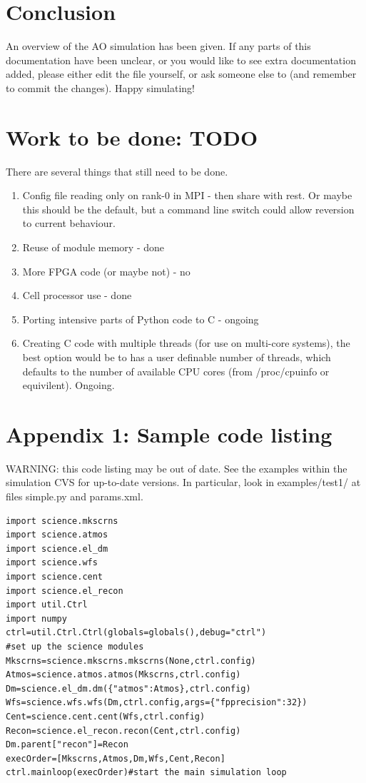 \documentclass{article}
\begin{document}
\section{Conclusion}
An overview of the AO simulation has been given.  If any parts of this
documentation have been unclear, or you would like to see extra
documentation added, please either edit the file yourself, or ask
someone else to (and remember to commit the changes).  Happy
simulating!

\section{Work to be done: TODO}
There are several things that still need to be done.
\begin{enumerate}
\item Config file reading only on rank-0 in MPI - then share with
  rest.  Or maybe this should be the default, but a command line
  switch could allow reversion to current behaviour.
\item Reuse of module memory - done
\item More FPGA code (or maybe not) - no
\item Cell processor use - done
\item Porting intensive parts of Python code to C - ongoing
\item Creating C code with multiple threads (for use on multi-core
  systems), the best option would be to has a user definable number of
  threads, which defaults to the number of available CPU cores (from
  /proc/cpuinfo or equivilent).  Ongoing.
\end{enumerate}


\appendix
\section*{Appendix 1: Sample code listing}
\label{app:src}
WARNING: this code listing may be out of date.  See the examples
within the simulation CVS for up-to-date versions.  In particular,
look in examples/test1/ at files simple.py and params.xml.

\begin{verbatim}
import science.mkscrns
import science.atmos
import science.el_dm
import science.wfs
import science.cent
import science.el_recon
import util.Ctrl
import numpy
ctrl=util.Ctrl.Ctrl(globals=globals(),debug="ctrl")
#set up the science modules
Mkscrns=science.mkscrns.mkscrns(None,ctrl.config)
Atmos=science.atmos.atmos(Mkscrns,ctrl.config)
Dm=science.el_dm.dm({"atmos":Atmos},ctrl.config)
Wfs=science.wfs.wfs(Dm,ctrl.config,args={"fpprecision":32})
Cent=science.cent.cent(Wfs,ctrl.config)
Recon=science.el_recon.recon(Cent,ctrl.config)
Dm.parent["recon"]=Recon
execOrder=[Mkscrns,Atmos,Dm,Wfs,Cent,Recon]
ctrl.mainloop(execOrder)#start the main simulation loop
\end{verbatim}
\end{document}
